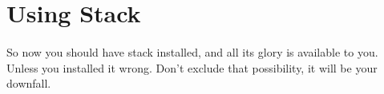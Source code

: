 \section{Using Stack}
\paragraph{}
So now you should have stack installed, and all its glory is available to you.  Unless you installed it wrong.  Don't exclude that possibility, it will be your downfall.  


\paragraph{}

